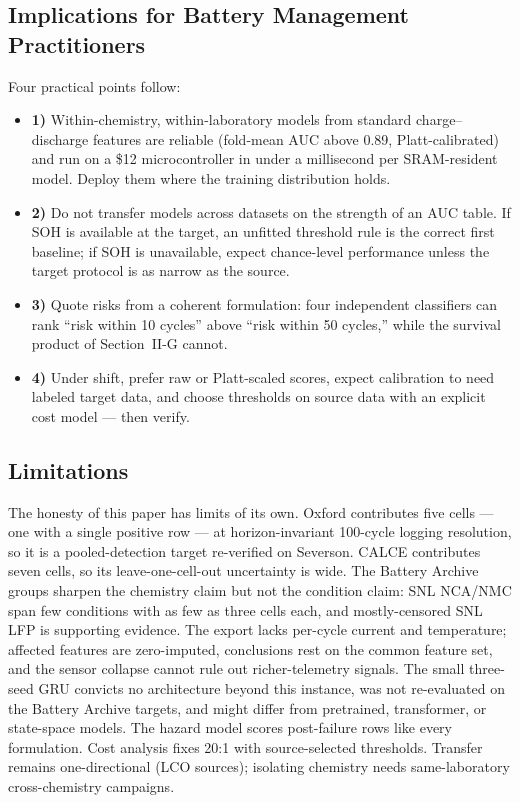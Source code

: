 \subsection{Implications for Battery Management Practitioners}
Four practical points follow:
\begin{itemize}
\item \textbf{1)} Within-chemistry, within-laboratory models from standard charge--discharge features are reliable (fold-mean AUC above 0.89, Platt-calibrated) and run on a \$12 microcontroller in under a millisecond per SRAM-resident model. Deploy them where the training distribution holds.
\item \textbf{2)} Do not transfer models across datasets on the strength of an AUC table. If SOH is available at the target, an unfitted threshold rule is the correct first baseline; if SOH is unavailable, expect chance-level performance unless the target protocol is as narrow as the source.
\item \textbf{3)} Quote risks from a coherent formulation: four independent classifiers can rank ``risk within 10 cycles'' above ``risk within 50 cycles,'' while the survival product of Section~II-G cannot.
\item \textbf{4)} Under shift, prefer raw or Platt-scaled scores, expect calibration to need labeled target data, and choose thresholds on source data with an explicit cost model --- then verify.
\end{itemize}

\subsection{Limitations}
The honesty of this paper has limits of its own. Oxford contributes five cells --- one with a single positive row --- at horizon-invariant 100-cycle logging resolution, so it is a pooled-detection target re-verified on Severson. CALCE contributes seven cells, so its leave-one-cell-out uncertainty is wide. The Battery Archive groups sharpen the chemistry claim but not the condition claim: SNL NCA/NMC span few conditions with as few as three cells each, and mostly-censored SNL LFP is supporting evidence. The export lacks per-cycle current and temperature; affected features are zero-imputed, conclusions rest on the common feature set, and the sensor collapse cannot rule out richer-telemetry signals. The small three-seed GRU convicts no architecture beyond this instance, was not re-evaluated on the Battery Archive targets, and might differ from pretrained, transformer, or state-space models. The hazard model scores post-failure rows like every formulation. Cost analysis fixes 20:1 with source-selected thresholds. Transfer remains one-directional (LCO sources); isolating chemistry needs same-laboratory cross-chemistry campaigns.


